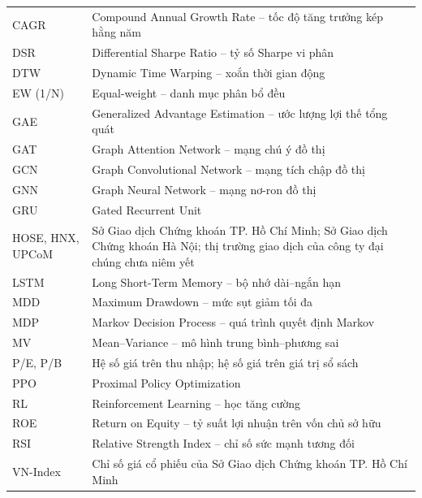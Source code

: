 {\begin{longtable}{@{}p{3.1cm}p{11.6cm}@{}}
\midrule
CAGR & Compound Annual Growth Rate -- tốc độ tăng trưởng kép hằng năm \\
DSR & Differential Sharpe Ratio -- tỷ số Sharpe vi phân \\
DTW & Dynamic Time Warping -- xoắn thời gian động \\
EW (1/N) & Equal-weight -- danh mục phân bổ đều \\
GAE & Generalized Advantage Estimation -- ước lượng lợi thế tổng quát \\
GAT & Graph Attention Network -- mạng chú ý đồ thị \\
GCN & Graph Convolutional Network -- mạng tích chập đồ thị \\
GNN & Graph Neural Network -- mạng nơ-ron đồ thị \\
GRU & Gated Recurrent Unit \\
HOSE, HNX, UPCoM & Sở Giao dịch Chứng khoán TP. Hồ Chí Minh; Sở Giao dịch Chứng khoán Hà Nội; thị trường giao dịch của công ty đại chúng chưa niêm yết \\
LSTM & Long Short-Term Memory -- bộ nhớ dài--ngắn hạn \\
MDD & Maximum Drawdown -- mức sụt giảm tối đa \\
MDP & Markov Decision Process -- quá trình quyết định Markov \\
MV & Mean--Variance -- mô hình trung bình--phương sai \\
P/E, P/B & Hệ số giá trên thu nhập; hệ số giá trên giá trị sổ sách \\
PPO & Proximal Policy Optimization \\
RL & Reinforcement Learning -- học tăng cường \\
ROE & Return on Equity -- tỷ suất lợi nhuận trên vốn chủ sở hữu \\
RSI & Relative Strength Index -- chỉ số sức mạnh tương đối \\
VN-Index & Chỉ số giá cổ phiếu của Sở Giao dịch Chứng khoán TP. Hồ Chí Minh \\
\bottomrule
\end{longtable}}
